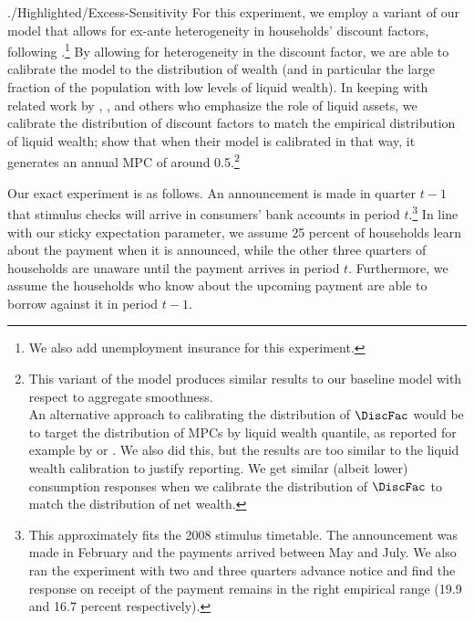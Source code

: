 \begin{verbatimwrite}{./Highlighted/Excess-Sensitivity}
  For this experiment, we employ a variant of our model that allows for ex-ante heterogeneity in households' discount factors, following \cite{cstwMPC}.\footnote{We also add unemployment insurance for this experiment.} By allowing for heterogeneity in the discount factor, we are able to calibrate the model to the distribution of wealth (and in particular the large fraction of the population with low levels of liquid wealth).  In keeping with related work by \cite{kvwWealthyH2m}, \cite{kmvHANK}, and others who emphasize the role of liquid assets, we calibrate the distribution of discount factors to match the empirical distribution of liquid wealth; \cite{cstwMPC} show that when their model is calibrated in that way, it generates an annual MPC of around 0.5.\footnote{This variant of the model produces similar results to our baseline model with respect to aggregate smoothness.\\
    An alternative approach to calibrating the distribution of $\DiscFac$ would be to target the distribution of MPCs by liquid wealth quantile, as reported for example by \cite{fhnMPC} or \cite{ckConsumption}. We also did this, but the results are too similar to the liquid wealth calibration to justify reporting.  We get similar (albeit lower) consumption responses when we calibrate the distribution of $\DiscFac$ to match the distribution of net wealth.}

  Our exact experiment is as follows.  An announcement is made in quarter $t-1$ that stimulus checks will arrive in consumers' bank accounts in period $t$.\footnote{This approximately fits the 2008 stimulus timetable. The announcement was made in February and the payments arrived between May and July. We also ran the experiment with two and three quarters advance notice and find the response on receipt of the payment remains in the right empirical range (19.9 and 16.7 percent respectively).} In line with our sticky expectation parameter, we assume 25 percent of households learn about the payment when it is announced, while the other three quarters of households are unaware until the payment arrives in period $t$. Furthermore, we assume the households who know about the upcoming payment are able to borrow against it in period $t-1$.


\end{verbatimwrite}
